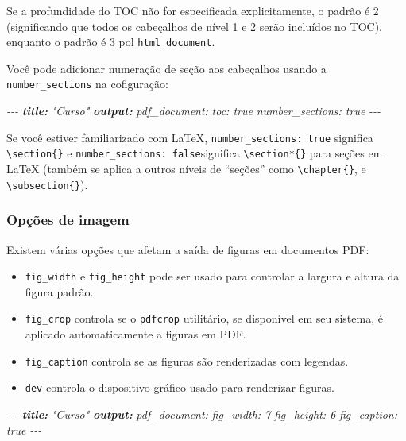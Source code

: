 \documentclass[
]{book}
\newenvironment{Shaded}{\begin{snugshade}}{\end{snugshade}}
\newcommand{\AnnotationTok}[1]{\textcolor[rgb]{0.56,0.35,0.01}{\textbf{\textit{#1}}}}
\newcommand{\CommentTok}[1]{\textcolor[rgb]{0.56,0.35,0.01}{\textit{#1}}}
\begin{document}
Se a profundidade do TOC não for especificada explicitamente, o padrão é 2 (significando que todos os cabeçalhos de nível 1 e 2 serão incluídos no TOC), enquanto o padrão é 3 pol \texttt{html\_document}.

Você pode adicionar numeração de seção aos cabeçalhos usando a \texttt{number\_sections} na cofiguração:

\begin{Shaded}
\begin{Highlighting}[]
\CommentTok{{-}{-}{-}}
\AnnotationTok{title:}\CommentTok{ "Curso"}
\AnnotationTok{output:}
\CommentTok{  pdf\_document:}
\CommentTok{    toc: true}
\CommentTok{    number\_sections: true}
\CommentTok{{-}{-}{-}}
\end{Highlighting}
\end{Shaded}

Se você estiver familiarizado com LaTeX, \texttt{number\_sections:\ true} significa \texttt{\textbackslash{}section\{\}} e \texttt{number\_sections:\ false}significa \texttt{\textbackslash{}section*\{\}} para seções em LaTeX (também se aplica a outros níveis de ``seções'' como \texttt{\textbackslash{}chapter\{\}}, e \texttt{\textbackslash{}subsection\{\}}).

\hypertarget{opuxe7uxf5es-de-imagem}{%
\subsubsection{Opções de imagem}\label{opuxe7uxf5es-de-imagem}}

Existem várias opções que afetam a saída de figuras em documentos PDF:

\begin{itemize}
\item
  \texttt{fig\_width} e \texttt{fig\_height} pode ser usado para controlar a largura e altura da figura padrão.
\item
  \texttt{fig\_crop} controla se o \texttt{pdfcrop} utilitário, se disponível em seu sistema, é aplicado automaticamente a figuras em PDF.
\item
  \texttt{fig\_caption} controla se as figuras são renderizadas com legendas.
\item
  \texttt{dev} controla o dispositivo gráfico usado para renderizar figuras.
\end{itemize}

\begin{Shaded}
\begin{Highlighting}[]
\CommentTok{{-}{-}{-}}
\AnnotationTok{title:}\CommentTok{ "Curso"}
\AnnotationTok{output:}
\CommentTok{  pdf\_document:}
\CommentTok{    fig\_width: 7}
\CommentTok{    fig\_height: 6}
\CommentTok{    fig\_caption: true}
\CommentTok{{-}{-}{-}}
\end{Highlighting}
\end{Shaded}
\end{document}
